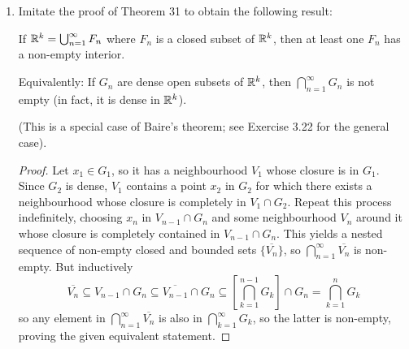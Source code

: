 \begin{enumerate}
\begin{proof}
Now, if $(a, b)$ and $(c, d)$ share at least one point, then $c < b$ and $d > a$. Since $a, c \not\in A$, we must have $a \ge c$ and $c \ge a$, so $a = c$. Similarly $b = d$ so the intervals are the same. That is, if two intervals share any point, they must be the same interval. Now, every interval $I_x$ contains at least one rational since $\Q$ is dense, so there exists an injection from our set of open sets to the countable set of rational numbers. Thus, our set is countable, as required.
\end{proof}

\item %
Imitate the proof of Theorem 31 to obtain the following result:

If $\mathbb{R}^k = \bigcup_{n=1}^{\infty} F_n$ where $F_n$ is a closed subset of $\mathbb{R}^k$, then at least one $F_n$ has a non-empty interior.

Equivalently: If $G_n$ are dense open subsets of $\mathbb{R}^k$, then $\bigcap_{n=1}^{\infty} G_n$ is not empty (in fact, it is dense in $\mathbb{R}^k$).

(This is a special case of Baire's theorem; see Exercise 3.22 for the general case).

\begin{proof}
Let $x_1 \in G_1$, so it has a neighbourhood $V_1$ whose closure is in $G_1$. Since $G_2$ is dense, $V_1$ contains a point $x_2$ in $G_2$ for which there exists a neighbourhood whose closure is completely in $V_1 \cap G_2$. Repeat this process indefinitely, choosing $x_n$ in $V_{n-1} \cap G_n$ and some neighbourhood $V_n$ around it whose closure is completely contained in $V_{n-1} \cap G_n$. This yields a nested sequence of non-empty closed and bounded sets $\{\overline{V_n}\}$, so $\bigcap_{n=1}^{\infty} \overline{V_n}$ is non-empty. But inductively
\[
	\overline{V_n} \subseteq V_{n-1} \cap G_n \subseteq \overline{V_{n-1}} \cap G_n \subseteq \left[\bigcap_{k=1}^{n-1} G_k\right] \cap G_n = \bigcap_{k=1}^{n} G_k
\]
so any element in $\bigcap_{n=1}^{\infty} \overline{V_n}$ is also in $\bigcap_{k=1}^{\infty} G_k$, so the latter is non-empty, proving the given equivalent statement.
\end{proof}
\end{enumerate}